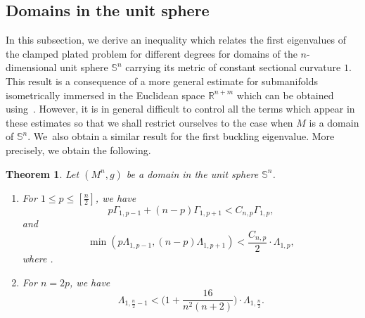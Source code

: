 \documentclass[pdftex]{sigma}
\numberwithin{equation}{section}
\newtheorem{Theorem}{Theorem}[section]
\theoremstyle{definition}
\begin{document}
\subsection{Domains in the unit sphere}%

In this subsection, we derive an inequality which relates the first eigenvalues of the clamped plated problem for different degrees for domains of the $n$-dimensional unit sphere $\mathbb{S}^n$ carrying its metric of constant sectional curvature $1$.
This result is a consequence of a more general estimate for submanifolds isometrically immersed in the Euclidean space $\mathbb{R}^{n+m}$ which can be obtained using~\cite[Lemma 3.8]{EGHM}.
However, it is in general difficult to control all the terms which appear in these estimates so that we shall restrict ourselves to the case when $M$ is a domain of $\mathbb{S}^n$.
We~also obtain a similar result for the first buckling eigenvalue.
More precisely, we obtain the following.

\begin{Theorem}\label{t:domainSn}
Let $(M^n,g)$ be a domain in the unit sphere $\mathbb{S}^n$.
\begin{enumerate}\itemsep=0pt
\item[$1.$] For $1\leq p\leq [\frac{n}{2}]$, we have
\begin{equation}\label{eq:upperboundGammainSn}
p \Gamma_{1,p-1}+ (n-p) \Gamma_{1,p+1}< C_{n,p} \Gamma_{1,p},
\end{equation}
and
\begin{equation}\label{eq:upperboundLambdainSn}
\min( p\Lambda_{1,p-1}, (n-p)\Lambda_{1,p+1})< \frac{C_{n,p}}{2}\cdot\Lambda_{1,p},
\end{equation}
where .
\item[$2.$] For $n=2p$, we have
\begin{equation}\label{eq:upperboundLambdainSnforn=2p}
\Lambda_{1,\frac{n}{2}-1} < \biggl(1+\frac{16}{n^2(n+2)}\biggr)\cdot \Lambda_{1,\frac{n}{2}}.
\end{equation}
\end{enumerate}
\end{Theorem}
\end{document}
